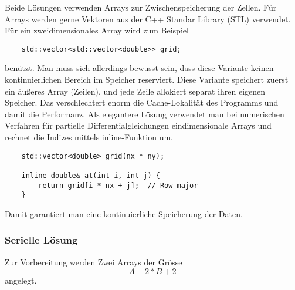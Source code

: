 Beide Lösungen verwenden Arrays zur Zwischenspeicherung der Zellen.
Für Arrays werden gerne Vektoren aus der C++ Standar Library (STL) verwendet.
Für ein zweidimensionales Array wird zum Beispiel
\begin{lstlisting}
	std::vector<std::vector<double>> grid;
\end{lstlisting}
benützt.
Man muss sich allerdings bewusst sein, dass diese Variante keinen kontinuierlichen Bereich im Speicher reserviert.
Diese Variante speichert zuerst ein äußeres Array (Zeilen), und jede Zeile allokiert separat ihren eigenen Speicher.
Das verschlechtert enorm die Cache-Lokalität des Programms und damit die Performanz.
Als elegantere Lösung verwendet man bei numerischen Verfahren für partielle Differentialgleichungen eindimensionale Arrays und rechnet die Indizes mittels inline-Funktion um.
\begin{lstlisting}
	std::vector<double> grid(nx * ny);
	
	inline double& at(int i, int j) {
		return grid[i * nx + j];  // Row-major
	}
\end{lstlisting}
Damit garantiert man eine kontinuierliche Speicherung der Daten.

\subsubsection{Serielle Lösung}
\label{parallelisierung:sub:serLoesung}
Zur Vorbereitung werden Zwei Arrays der Grösse 
\begin{equation}
A+2 * B+2 
\end{equation}
angelegt. 

